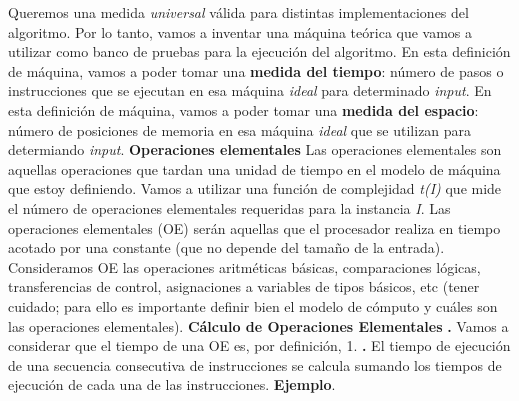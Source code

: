 \documentclass[10pt,a4paper]{article}
\begin{document}
Queremos una medida \textit{universal} válida para distintas implementaciones del algoritmo.
\newline
\newline
Por lo tanto, vamos a inventar una máquina teórica que vamos a utilizar como banco de pruebas para la ejecución del algoritmo. 
\newline
\newline
En esta definición de máquina, vamos a poder tomar una \textbf{medida del tiempo}: número de pasos o instrucciones que se ejecutan en esa máquina \textit{ideal} para determinado \textit{input}.
\newline
\newline
En esta definición de máquina, vamos a poder tomar una \textbf{medida del espacio}: número de posiciones de memoria en esa máquina \textit{ideal} que se utilizan para determiando \textit{input}.
\newline
\newline
\textbf{Operaciones elementales}
\newline
\newline
Las operaciones elementales son aquellas operaciones que tardan una unidad de tiempo en el modelo de máquina que estoy definiendo.
\newline
\newline
Vamos a utilizar una función de complejidad \textit{t(I)} que mide el número de operaciones elementales requeridas para la instancia \textit{I}.
\newline
\newline
Las operaciones elementales (OE) serán aquellas que el procesador realiza en tiempo acotado por una constante (que no depende del tamaño de la entrada).
\newline
\newline
Consideramos OE las operaciones aritméticas básicas, comparaciones lógicas, transferencias de control, asignaciones a variables de tipos básicos, etc (tener cuidado; para ello es importante definir bien el modelo de cómputo y cuáles son las operaciones elementales).
\newline
\newline
\textbf{Cálculo de Operaciones Elementales}
\newline
\newline
\textbf{.} Vamos a considerar que el tiempo de una OE es, por definición, 1.
\newline
\newline
\textbf{.} El tiempo de ejecución de una secuencia consecutiva de instrucciones se calcula sumando los tiempos de ejecución de cada una de las instrucciones.
\newline
\newline
\textbf{Ejemplo}.
\end{document}
